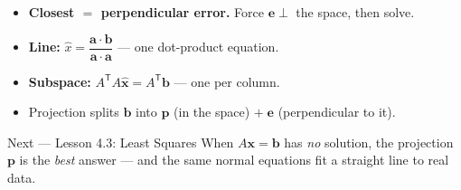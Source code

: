 \documentclass[aspectratio=169, 11pt]{beamer}
\newcommand{\xx}{\mathbf{x}}
\newcommand{\bb}{\mathbf{b}}
\newcommand{\pp}{\mathbf{p}}
\newcommand{\ee}{\mathbf{e}}
\newcommand{\avec}{\mathbf{a}}
\newcommand{\T}{\mathsf{T}}
\begin{document}
\begin{frame}[t, plain]
  \begin{itemize}
    \setlength{\itemsep}{6pt}
    \item \textbf{Closest $=$ perpendicular error.} Force $\ee\perp$ the space, then solve.
    \item \textbf{Line:} $\hat{x}=\dfrac{\avec\cdot\bb}{\avec\cdot\avec}$ --- one dot-product equation.
    \item \textbf{Subspace:} $A^{\T}A\hat{\xx}=A^{\T}\bb$ --- one per column.
    \item Projection splits $\bb$ into $\pp$ (in the space) $+\;\ee$ (perpendicular to it).
  \end{itemize}
  \vspace{2pt}
  \begin{block}{Next --- Lesson 4.3: Least Squares}
    When $A\xx=\bb$ has \emph{no} solution, the projection $\pp$ is the \emph{best} answer --- and the
    same normal equations fit a straight line to real data.
  \end{block}
\end{frame}
\end{document}

